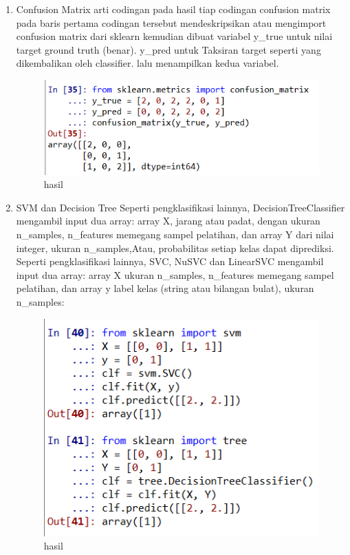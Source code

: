 \begin{enumerate}
\item Confusion Matrix
arti codingan pada hasil tiap codingan confusion matrix pada baris pertama codingan tersebut mendeskripsikan atau mengimport confusion matrix dari sklearn kemudian dibuat variabel y\_true untuk nilai target ground truth (benar). y\_pred untuk Taksiran target seperti yang dikembalikan oleh classifier. lalu menampilkan kedua variabel.

\begin{figure}[ht]
\centering
\includegraphics[scale=0.5]{figures/1174003/3/8.PNG}
\caption{hasil}
\label{contoh}
\end{figure}

\item SVM dan Decision Tree
Seperti pengklasifikasi lainnya, DecisionTreeClassifier mengambil input dua array: array X, jarang atau padat, dengan ukuran n\_samples, n\_features memegang sampel pelatihan, dan array Y dari nilai integer, ukuran n\_samples,Atau, probabilitas setiap kelas dapat diprediksi. Seperti pengklasifikasi lainnya, SVC, NuSVC dan LinearSVC mengambil input dua array: array X ukuran n\_samples, n\_features memegang sampel pelatihan, dan array y label kelas (string atau bilangan bulat), ukuran n\_samples:

\begin{figure}[ht]
\centering
\includegraphics[scale=0.5]{figures/1174003/3/9.PNG}
\caption{hasil}
\label{contoh}
\end{figure}


\end{enumerate}
